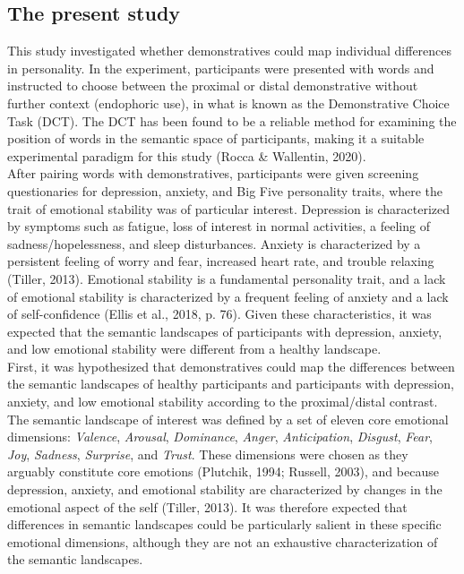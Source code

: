 \documentclass[11pt, a4paper]{article}
\begin{document}
\subsection{The present study}
This study investigated whether demonstratives could map individual differences in personality. In the experiment, participants were presented with words and instructed to choose between the proximal or distal demonstrative without further context (endophoric use), in what is known as the Demonstrative Choice Task (DCT). The DCT has been found to be a reliable method for examining the position of words in the semantic space of participants, making it a suitable experimental paradigm for this study (Rocca \& Wallentin, 2020). \\
After pairing words with demonstratives, participants were given screening questionaries for depression, anxiety, and Big Five personality traits, where the trait of emotional stability was of particular interest. Depression is characterized by symptoms such as fatigue, loss of interest in normal activities, a feeling of sadness/hopelessness, and sleep disturbances. Anxiety is characterized by a persistent feeling of worry and fear, increased heart rate, and trouble relaxing (Tiller, 2013). Emotional stability is a fundamental personality trait, and a lack of emotional stability is characterized by a frequent feeling of anxiety and a lack of self-confidence (Ellis et al., 2018, p. 76).  Given these characteristics, it was expected that the semantic landscapes of participants with depression, anxiety, and low emotional stability were different from a healthy landscape. \\

First, it was hypothesized that demonstratives could map the differences between the semantic landscapes of healthy participants and participants with depression, anxiety, and low emotional stability according to the proximal/distal contrast. The semantic landscape of interest was defined by a set of eleven core emotional dimensions: \textit{Valence}, \textit{Arousal}, \textit{Dominance}, \textit{Anger}, \textit{Anticipation}, \textit{Disgust}, \textit{Fear}, \textit{Joy}, \textit{Sadness}, \textit{Surprise}, and \textit{Trust}. These dimensions were chosen as they arguably constitute core emotions (Plutchik, 1994; Russell, 2003), and because depression, anxiety, and emotional stability are characterized by changes in the emotional aspect of the self (Tiller, 2013). It was therefore expected that differences in semantic landscapes could be particularly salient in these specific emotional dimensions, although they are not an exhaustive characterization of the semantic landscapes. \\
\end{document}
